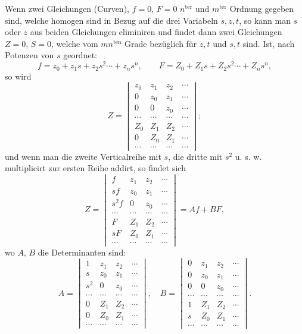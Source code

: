 \documentclass[10pt]{article}
\begin{document}
Wenn zwei Gleichungen (Curven), $f=0$, $F=0$ $n^{\text{ter}}$ und $m^{\text{ter}}$ Ordnung gegeben sind, welche homogen sind in Bezug auf die drei Variabeln $s,z,t$, so kann man $s$ oder $z$ aus beiden Gleichungen eliminiren und findet dann zwei Gleichungen $Z=0$, $S=0$, welche vom $mn^{\text{ten}}$ Grade bezüglich für $z,t$ und $s,t$ sind. Ist, nach Potenzen von $s$ geordnet:
\[
f=z_0+z_1s+z_2s^2\cdots+z_ns^n,
\qquad
F=Z_0+Z_1s+Z_2s^2\cdots+Z_ns^n,
\]
so wird
\[
Z=\begin{vmatrix}
z_0&z_1&z_2&\cdots\\
0&z_0&z_1&\cdots\\
0&0&z_0&\cdots\\
\cdots&\cdots&\cdots&\cdots\\
Z_0&Z_1&Z_2&\cdots\\
0&Z_0&Z_1&\cdots\\
\cdots&\cdots&\cdots&\cdots
\end{vmatrix};
\]
und wenn man die zweite Verticalreihe mit $s$, die dritte mit $s^2$ u. s. w. multiplicirt zur ersten Reihe addirt, so findet sich
\[
Z=\begin{vmatrix}
f&z_1&z_2&\cdots\\
sf&z_0&z_1&\cdots\\
s^2f&0&z_0&\cdots\\
\cdots&\cdots&\cdots&\cdots\\
F&Z_1&Z_2&\cdots\\
sF&Z_0&Z_1&\cdots\\
\cdots&\cdots&\cdots&\cdots
\end{vmatrix}=Af+BF,
\]
wo $A$, $B$ die Determinanten sind:
\[
A=\begin{vmatrix}
1&z_1&z_2&\cdots\\
s&z_0&z_1&\cdots\\
s^2&0&z_0&\cdots\\
\cdots&\cdots&\cdots&\cdots\\
0&Z_1&Z_2&\cdots\\
0&Z_0&Z_1&\cdots\\
\cdots&\cdots&\cdots&\cdots
\end{vmatrix},\quad
B=\begin{vmatrix}
0&z_1&z_2&\cdots\\
0&z_0&z_1&\cdots\\
0&0&z_0&\cdots\\
\cdots&\cdots&\cdots&\cdots\\
1&Z_1&Z_2&\cdots\\
s&Z_0&Z_1&\cdots\\
\cdots&\cdots&\cdots&\cdots
\end{vmatrix}.
\]
\end{document}

